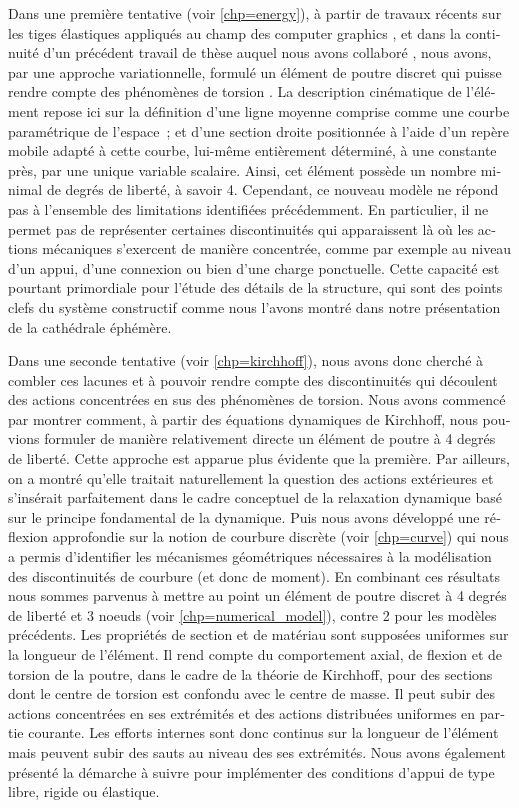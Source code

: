 \begin{otherlanguage}{french}
Dans une première tentative (voir \cref{chp=energy}), à partir de travaux récents sur les tiges élastiques appliqués au champ des computer graphics \cite{Bergou2008}, et dans la continuité d'un précédent travail de thèse auquel nous avons collaboré \cite{Tayeb2015a}, nous avons, par une approche variationnelle, formulé un élément de poutre discret qui puisse rendre compte des phénomènes de torsion \cite{Lefevre2017}. La description cinématique de l'élément repose ici sur la définition d'une ligne moyenne comprise comme une courbe paramétrique de l'espace~; et d'une section droite positionnée à l'aide d'un repère mobile adapté à cette courbe, lui-même entièrement déterminé, à une constante près, par une unique variable scalaire. Ainsi, cet élément possède un nombre minimal de degrés de liberté, à savoir 4. Cependant, ce nouveau modèle ne répond pas à l'ensemble des limitations identifiées précédemment. En particulier, il ne permet pas de représenter certaines discontinuités qui apparaissent là où les actions mécaniques s'exercent de manière concentrée, comme par exemple au niveau d'un appui, d'une connexion ou bien d'une charge ponctuelle. Cette capacité est pourtant primordiale pour l'étude des détails de la structure, qui sont des points clefs du système constructif comme nous l'avons montré dans notre présentation de la cathédrale éphémère.

Dans une seconde tentative (voir \cref{chp=kirchhoff}), nous avons donc cherché à combler ces lacunes et à pouvoir rendre compte des discontinuités qui découlent des actions concentrées en sus des phénomènes de torsion. Nous avons commencé par montrer comment, à partir des équations dynamiques de Kirchhoff, nous pouvions formuler de manière relativement directe un élément de poutre à 4 degrés de liberté. Cette approche est apparue plus évidente que la première. Par ailleurs, on a montré qu'elle traitait naturellement la question des actions extérieures et s'insérait parfaitement dans le cadre conceptuel de la relaxation dynamique basé sur le principe fondamental de la dynamique. Puis nous avons développé une réflexion approfondie sur la notion de courbure discrète (voir \cref{chp=curve}) qui nous a permis d'identifier les mécanismes géométriques nécessaires à la modélisation des discontinuités de courbure (et donc de moment). En combinant ces résultats nous sommes parvenus à mettre au point un élément de poutre discret à 4 degrés de liberté et 3 noeuds (voir \cref{chp=numerical_model}), contre 2 pour les modèles précédents. Les propriétés de section et de matériau sont supposées uniformes sur la longueur de l'élément. Il rend compte du comportement axial, de flexion et de torsion de la poutre, dans le cadre de la théorie de Kirchhoff, pour des sections dont le centre de torsion est confondu avec le centre de masse. Il peut subir des actions concentrées en ses extrémités et des actions distribuées uniformes en partie courante. Les efforts internes sont donc continus sur la longueur de l'élément mais peuvent subir des sauts au niveau des ses extrémités. Nous avons également présenté la démarche à suivre pour implémenter des conditions d'appui de type libre, rigide ou élastique.


\end{otherlanguage}
